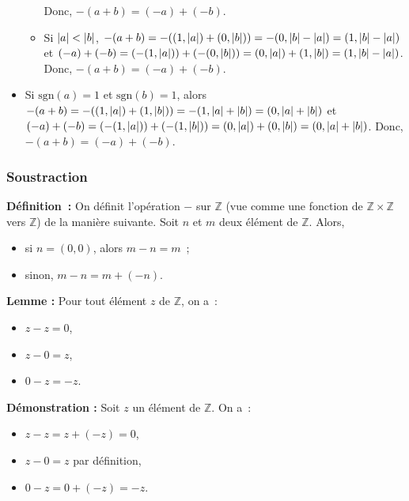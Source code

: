 \begin{itemize}[nosep]
\begin{itemize}[nosep]
                Donc, $-(a+b) = (-a) + (-b)$.
            \item Si $\left\lvert a \right\rvert < \left\lvert b \right\rvert$, $-(a+b) = -((1,\left\lvert a \right\rvert) + (0, \left\lvert b \right\rvert)) = -(0, \left\lvert b \right\rvert - \left\lvert a \right\rvert) = (1, \left\lvert b \right\rvert - \left\lvert a \right\rvert)$ et $(-a) + (-b) = (-(1, \left\lvert a \right\rvert)) + (-(0, \left\lvert b \right\rvert)) = (0, \left\lvert a \right\rvert) + (1, \left\lvert b \right\rvert) = (1, \left\lvert b \right\rvert - \left\lvert a \right\rvert)$.
                Donc, $-(a+b) = (-a) + (-b)$.
        \end{itemize}
    \item Si $\mathrm{sgn}(a) = 1$ et $\mathrm{sgn}(b) = 1$, alors $-(a+b) = -((1,\left\lvert a \right\rvert) + (1, \left\lvert b \right\rvert)) = -(1, \left\lvert a \right\rvert+\left\lvert b \right\rvert) = (0, \left\lvert a \right\rvert + \left\lvert b \right\rvert)$ et $(-a) + (-b) = (-(1,\left\lvert a \right\rvert)) + (-(1, \left\lvert b \right\rvert)) = (0, \left\lvert a \right\rvert) + (0, \left\lvert b \right\rvert) = (0, \left\lvert a \right\rvert + \left\lvert b \right\rvert)$.
        Donc, $-(a+b) = (-a) + (-b)$.
\end{itemize}

\subsubsection{Soustraction}

\noindent\textbf{Définition :} 
    On définit l'opération $-$ sur $\mathbb{Z}$ (vue comme une fonction de $\mathbb{Z} \times \mathbb{Z}$ vers $\mathbb{Z}$) de la manière suivante.
    Soit $n$ et $m$ deux élément de $\mathbb{Z}$.
    Alors, 
    \begin{itemize}[nosep]
        \item si $n = (0,0)$, alors $m - n = m$ ;
        \item sinon, $m - n = m + (-n)$.
    \end{itemize}
    \sindex[isy]{$-$}

\medskip

\noindent\textbf{Lemme :} Pour tout élément $z$ de $\mathbb{Z}$, on a :
    \begin{itemize}[nosep]
        \item $z - z = 0$,
        \item $z - 0 = z$,
        \item $0 - z = -z$.
    \end{itemize}

\medskip

\noindent\textbf{Démonstration :} Soit $z$ un élément de $\mathbb{Z}$. On a :
    \begin{itemize}[nosep]
        \item $z - z = z + (-z) = 0$,
        \item $z - 0 = z$ par définition,
        \item $0 - z = 0 + (-z) = -z$.
    \end{itemize}

